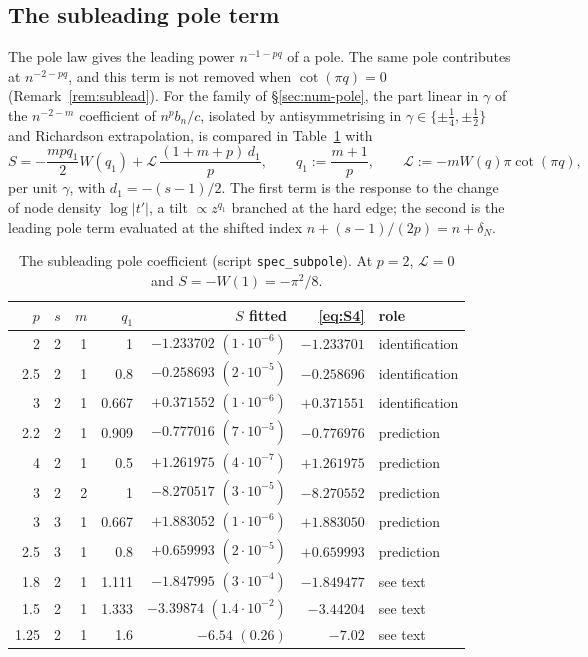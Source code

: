 \subsection{The subleading pole term}\label{sec:num-subpole}
The pole law gives the leading power $n^{-1-pq}$ of a pole. The same pole contributes at $n^{-2-pq}$, and this term is
not removed when $\cot(\pi q)=0$ (Remark~\ref{rem:sublead}). For the family of \S\ref{sec:num-pole}, the part linear in
$\gamma$ of the $n^{-2-m}$ coefficient of $n^pb_n/c$, isolated by antisymmetrising in $\gamma\in\{\pm\frac14,\pm\frac12\}$ and
Richardson extrapolation, is compared in Table~\ref{tab:subpole} with
\begin{equation}\label{eq:S4}
  S=-\frac{mpq_1}2W(q_1)+\mathcal L\,\frac{(1+m+p)\,d_1}p,\qquad q_1:=\frac{m+1}p,\qquad
  \mathcal L:=-mW(q)\pi\cot(\pi q),
\end{equation}
per unit $\gamma$, with $d_1=-(s-1)/2$. The first term is the response to the change of node density $\log|t'|$, a tilt
$\propto z^{q_1}$ branched at the hard edge; the second is the leading pole term evaluated at the shifted index
$n+(s-1)/(2p)=n+\delta_N$.

\begin{table}[ht]
\centering
\small
\begin{tabular}{rrrrrrl}
\toprule
$p$ & $s$ & $m$ & $q_1$ & $S$ fitted & \eqref{eq:S4} & role\\
\midrule
2 & 2 & 1 & 1 & $-1.233702$ $(1\cdot10^{-6})$ & $-1.233701$ & identification\\
2.5 & 2 & 1 & 0.8 & $-0.258693$ $(2\cdot10^{-5})$ & $-0.258696$ & identification\\
3 & 2 & 1 & 0.667 & $+0.371552$ $(1\cdot10^{-6})$ & $+0.371551$ & identification\\
2.2 & 2 & 1 & 0.909 & $-0.777016$ $(7\cdot10^{-5})$ & $-0.776976$ & prediction\\
4 & 2 & 1 & 0.5 & $+1.261975$ $(4\cdot10^{-7})$ & $+1.261975$ & prediction\\
3 & 2 & 2 & 1 & $-8.270517$ $(3\cdot10^{-5})$ & $-8.270552$ & prediction\\
3 & 3 & 1 & 0.667 & $+1.883052$ $(1\cdot10^{-6})$ & $+1.883050$ & prediction\\
2.5 & 3 & 1 & 0.8 & $+0.659993$ $(2\cdot10^{-5})$ & $+0.659993$ & prediction\\
1.8 & 2 & 1 & 1.111 & $-1.847995$ $(3\cdot10^{-4})$ & $-1.849477$ & see text\\
1.5 & 2 & 1 & 1.333 & $-3.39874$ $(1.4\cdot10^{-2})$ & $-3.44204$ & see text\\
1.25 & 2 & 1 & 1.6 & $-6.54$ $(0.26)$ & $-7.02$ & see text\\
\bottomrule
\end{tabular}
\caption{The subleading pole coefficient (script \texttt{spec\_subpole}). At $p=2$, $\mathcal L=0$ and $S=-W(1)=-\pi^2/8$.}
\label{tab:subpole}
\end{table}

